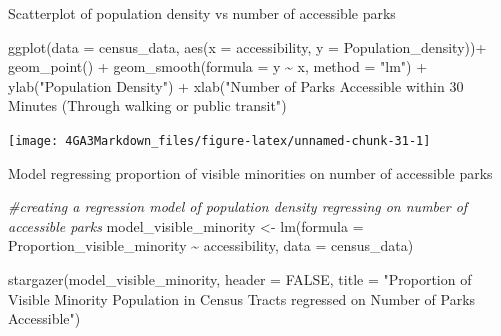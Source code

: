 \documentclass[
]{article}
\newenvironment{Shaded}{\begin{snugshade}}{\end{snugshade}}
\newcommand{\AttributeTok}[1]{\textcolor[rgb]{0.77,0.63,0.00}{#1}}
\newcommand{\CommentTok}[1]{\textcolor[rgb]{0.56,0.35,0.01}{\textit{#1}}}
\newcommand{\ConstantTok}[1]{\textcolor[rgb]{0.00,0.00,0.00}{#1}}
\newcommand{\FunctionTok}[1]{\textcolor[rgb]{0.00,0.00,0.00}{#1}}
\newcommand{\NormalTok}[1]{#1}
\newcommand{\OtherTok}[1]{\textcolor[rgb]{0.56,0.35,0.01}{#1}}
\newcommand{\SpecialCharTok}[1]{\textcolor[rgb]{0.00,0.00,0.00}{#1}}
\newcommand{\StringTok}[1]{\textcolor[rgb]{0.31,0.60,0.02}{#1}}
\begin{document}
Scatterplot of population density vs number of accessible parks

\begin{Shaded}
\begin{Highlighting}[]
\FunctionTok{ggplot}\NormalTok{(}\AttributeTok{data =}\NormalTok{ census\_data, }
       \FunctionTok{aes}\NormalTok{(}\AttributeTok{x =}\NormalTok{ accessibility, }
           \AttributeTok{y =}\NormalTok{ Population\_density))}\SpecialCharTok{+}
  \FunctionTok{geom\_point}\NormalTok{() }\SpecialCharTok{+}
  \FunctionTok{geom\_smooth}\NormalTok{(}\AttributeTok{formula =}\NormalTok{ y }\SpecialCharTok{\textasciitilde{}}\NormalTok{ x,}
              \AttributeTok{method =} \StringTok{"lm"}\NormalTok{) }\SpecialCharTok{+}
  \FunctionTok{ylab}\NormalTok{(}\StringTok{"Population Density"}\NormalTok{) }\SpecialCharTok{+}
  \FunctionTok{xlab}\NormalTok{(}\StringTok{"Number of Parks Accessible within 30 Minutes (Through walking or public transit"}\NormalTok{) }
\end{Highlighting}
\end{Shaded}

\begin{center}\texttt{[image: 4GA3Markdown\_files/figure-latex/unnamed-chunk-31-1]} \end{center}

Model regressing proportion of visible minorities on number of
accessible parks

\begin{Shaded}
\begin{Highlighting}[]
\CommentTok{\#creating a regression model of population density regressing on number of accessible parks}
\NormalTok{model\_visible\_minority }\OtherTok{\textless{}{-}} \FunctionTok{lm}\NormalTok{(}\AttributeTok{formula =}\NormalTok{ Proportion\_visible\_minority }\SpecialCharTok{\textasciitilde{}}\NormalTok{ accessibility, }
             \AttributeTok{data =}\NormalTok{ census\_data)}

\FunctionTok{stargazer}\NormalTok{(model\_visible\_minority,}
          \AttributeTok{header =} \ConstantTok{FALSE}\NormalTok{,}
          \AttributeTok{title =} \StringTok{"Proportion of Visible Minority Population in Census Tracts regressed on Number of Parks Accessible"}\NormalTok{)}
\end{Highlighting}
\end{Shaded}
\end{document}
